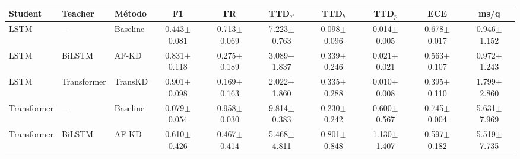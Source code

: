 \begin{tabular}{lllccccccc}
\toprule
\textbf{Student} & \textbf{Teacher} & \textbf{Método} & \textbf{F1} & \textbf{FR} & \textbf{TTD$_{\text{ef}}$} & \textbf{TTD$_b$} & \textbf{TTD$_p$} & \textbf{ECE} & \textbf{ms/q} \\
\midrule
LSTM & — & Baseline & 0.443{\tiny$\pm$0.081} & 0.713{\tiny$\pm$0.069} & 7.223{\tiny$\pm$0.763} & 0.098{\tiny$\pm$0.096} & 0.014{\tiny$\pm$0.005} & 0.678{\tiny$\pm$0.017} & 0.946{\tiny$\pm$1.152} \\
LSTM & BiLSTM & AF-KD & 0.831{\tiny$\pm$0.118} & 0.275{\tiny$\pm$0.189} & 3.089{\tiny$\pm$1.837} & 0.339{\tiny$\pm$0.246} & 0.021{\tiny$\pm$0.021} & 0.563{\tiny$\pm$0.107} & 0.972{\tiny$\pm$1.243} \\
LSTM & Transformer & TransKD & 0.901{\tiny$\pm$0.098} & 0.169{\tiny$\pm$0.163} & 2.022{\tiny$\pm$1.860} & 0.335{\tiny$\pm$0.288} & 0.010{\tiny$\pm$0.008} & 0.395{\tiny$\pm$0.110} & 1.799{\tiny$\pm$2.860} \\
\midrule
Transformer & — & Baseline & 0.079{\tiny$\pm$0.054} & 0.958{\tiny$\pm$0.030} & 9.814{\tiny$\pm$0.383} & 0.230{\tiny$\pm$0.242} & 0.600{\tiny$\pm$0.567} & 0.745{\tiny$\pm$0.004} & 5.631{\tiny$\pm$7.969} \\
Transformer & BiLSTM & AF-KD & 0.610{\tiny$\pm$0.426} & 0.467{\tiny$\pm$0.414} & 5.468{\tiny$\pm$4.811} & 0.801{\tiny$\pm$0.848} & 1.130{\tiny$\pm$1.407} & 0.597{\tiny$\pm$0.182} & 5.519{\tiny$\pm$7.735} \\
\bottomrule
\end{tabular}